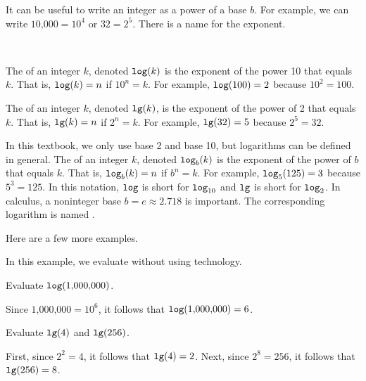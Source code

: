 \begin{exam} 
\begin{apart}
    \end{apart}    
\end{exam}

It can be useful to write an integer as a power of a base $b$.  For example, we can write $\text{10,000}=10^4$ or $32 = 2^5$.  There is a name for the exponent.  

\begin{defn}
\label{defn_log}
~
    \begin{apart}
        \item The  of an integer $k$, denoted $\texttt{log}(k)$ is the exponent of the power 10 that equals $k$. That is, $\texttt{log}(k)=n$ if $10^n=k$.  For example, $\texttt{log}(\text{100}) = 2$ because $10^2=100$.
        \item The  of an integer $k$, denoted $\texttt{lg}(k)$, is the exponent of the power of 2 that equals $k$. That is, $\texttt{lg}(k)=n$ if $2^n=k$.  For example, $\texttt{lg}(32) = 5 $ because $2^5=32$.
        \item In this textbook, we only use base 2 and base 10, but logarithms can be defined in general. The  of an integer $k$, denoted $\texttt{log}_b(k)$ is the exponent of the power of $b$ that equals $k$. That is, $\texttt{log}_b(k)=n$ if $b^n=k$.  For example, $\texttt{log}_5(125) = 3$ because $5^3=125$.  In this notation, $\texttt{log}$ is short for $\texttt{log}_{10}$ and $\texttt{lg}$ is short for $\texttt{log}_2$.  In calculus, a noninteger base $b=e \approx 2.718$ is important. The corresponding logarithm is named . 
    \end{apart}
\end{defn}

Here are a few more examples.

\begin{exam}
\label{exam_eval_logs}
    In this example, we evaluate without using technology.
        \begin{apart}
          \item Evaluate $\texttt{log}(\text{1,000,000})$. 
              \begin{soln}
                  Since $\text{1,000,000}= 10^6$, it follows that $\texttt{log}(\text{1,000,000})=6$.
              \end{soln}
          \item Evaluate $\texttt{lg}(4)$ and $\texttt{lg}(256)$.
              \begin{soln}
                  First, since $2^2=4$, it follows that $\texttt{lg}(4)=2$. Next, since $2^8=256$, it follows that $\texttt{lg}(256)=8$.
              \end{soln}
        \end{apart}
\end{exam}

